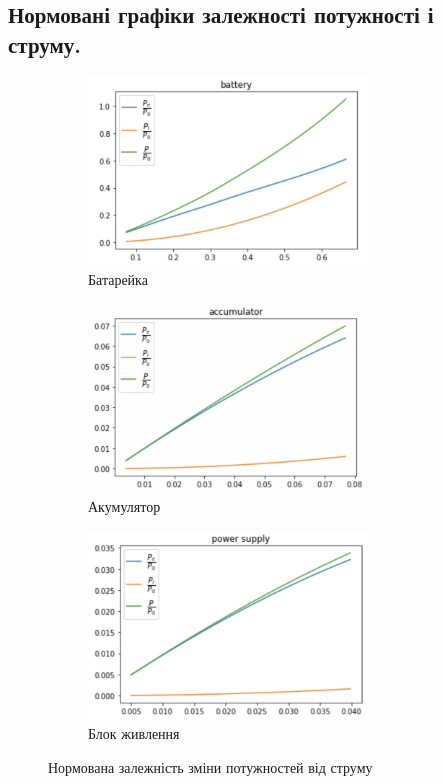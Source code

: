 \documentclass[a4paper,12pt]{article}
\begin{document}
\begin{justify}
	\subsection{Нормовані графіки залежності потужності і струму.}
	 \begin{figure}[!h]
		\centering
		\begin{subfigure}{0.4\linewidth}
			\includegraphics[height=50mm]{media/graph7aa.png}
    		\caption{Батарейка}
			\label{fig:7a}
    	\end{subfigure}\hfill
    	\begin{subfigure}{0.4\linewidth}
			\includegraphics[height=50mm]{media/graph7bb.png}
    		\caption{Акумулятор}
			\label{fig:7b}
    	\end{subfigure}\hfill
    	\begin{subfigure}{0.4\linewidth}
			\includegraphics[height=50mm]{media/graph7cc.png}
    		\caption{Блок живлення}
			\label{fig:7c}
    	\end{subfigure}\hfill
		\caption{Нормована залежність зміни потужностей від струму}

\end{figure}
\end{justify}
\end{document}
